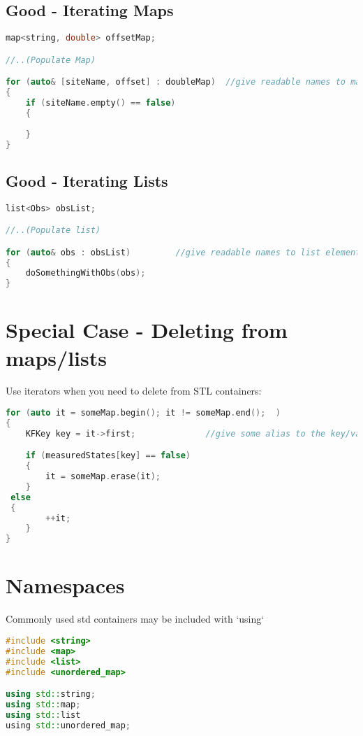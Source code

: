 \subsection{Good - Iterating Maps}
\begin{lstlisting}[language=c++]
map<string, double> offsetMap;

//..(Populate Map)

for (auto& [siteName, offset] : doubleMap)	//give readable names to map keys and values
{
    if (siteName.empty() == false)
    {
    
    }
}
\end{lstlisting}
\subsection{ Good - Iterating Lists}
\begin{lstlisting}[language=c++]
list<Obs> obsList;

//..(Populate list)

for (auto& obs : obsList)         //give readable names to list elements
{
    doSomethingWithObs(obs);
}
\end{lstlisting}

\section{Special Case - Deleting from maps/lists}

Use iterators when you need to delete from STL containers:
\begin{lstlisting}[language=c++]
for (auto it = someMap.begin(); it != someMap.end();  )
{
    KFKey key = it->first;				//give some alias to the key/value so they're readable

    if (measuredStates[key] == false)
    {
    	it = someMap.erase(it);
   	}
 else
 {
    	++it;
   	}
}
\end{lstlisting}
\section{Namespaces}

Commonly used std containers may be included with `using`
\begin{lstlisting}[language=c++]
#include <string>
#include <map>
#include <list>
#include <unordered_map>

using std::string;
using std::map;
using std::list
using std::unordered_map;
\end{lstlisting}
